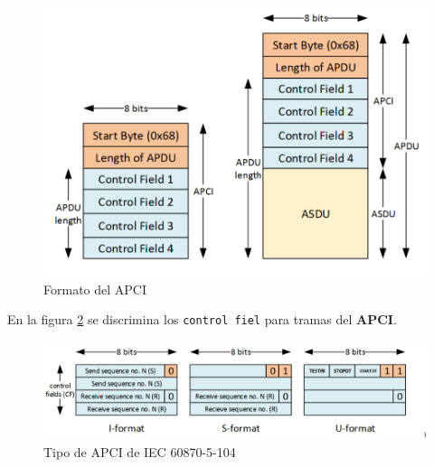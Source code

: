 \documentclass[a5paper]{book}%
\begin{document}
  
\begin{figure}[H]
  	\centering
  	\caption{Formato del APCI}
  	\label{fig:cabecera104}
  	\includegraphics[width=0.7\linewidth]{cabecera_104}
\end{figure}

En la figura \ref{fig:tramas104} se discrimina los \texttt{control fiel} para tramas  del \textbf{APCI}.
  
\begin{figure}[H]
	\centering
	\caption{Tipo de APCI de IEC 60870-5-104}
	\label{fig:tramas104}
	\includegraphics[width=0.7\linewidth]{tramas_104_}
\end{figure}
  
\end{document}
